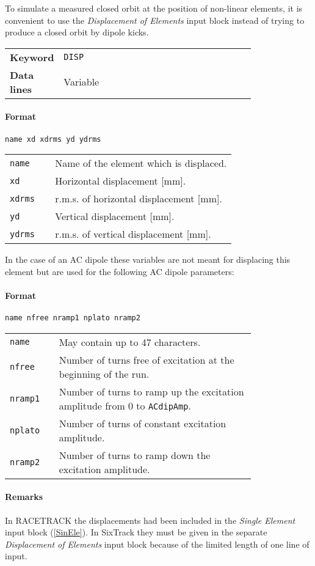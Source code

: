 To simulate a measured closed orbit at the position of non-linear elements, it is convenient to use the \textit{Displacement of Elements} input block instead of trying to produce a closed orbit by dipole kicks.

\bigskip
\begin{tabular}{@{}lp{0.80\linewidth}}
    \textbf{Keyword} & \texttt{DISP} \\
    \textbf{Data lines} & Variable
\end{tabular}

\paragraph{Format} \texttt{name xd xdrms yd ydrms}

\bigskip
\begin{tabular}{@{}lp{0.80\linewidth}}
    \texttt{name}  & Name of the element which is displaced. \\
    \texttt{xd}    & Horizontal displacement [mm]. \\
    \texttt{xdrms} & r.m.s. of horizontal displacement [mm]. \\
    \texttt{yd}    & Vertical displacement [mm]. \\
    \texttt{ydrms} & r.m.s. of vertical displacement [mm].
\end{tabular}

\bigskip
\noindent In the case of an AC dipole these variables are not meant for displacing this element but are used for the following AC dipole parameters:

\paragraph{Format} \texttt{name nfree nramp1 nplato nramp2}

\bigskip
\begin{tabular}{@{}lp{0.80\linewidth}}
    \texttt{name}   & May contain up to 47 characters. \\
    \texttt{nfree}  & Number of turns free of excitation at the beginning of the run. \\
    \texttt{nramp1} & Number of turns to ramp up the excitation amplitude from 0 to \texttt{ACdipAmp}. \\
    \texttt{nplato} & Number of turns of constant excitation amplitude. \\
    \texttt{nramp2} & Number of turns to ramp down the excitation amplitude.
\end{tabular}

\paragraph{Remarks}
In RACETRACK the displacements had been included in the \textit{Single Element} input block (\ref{SinEle}).
In SixTrack they must be given in the separate \textit{Displacement of Elements} input block because of the limited length of one line of input.


